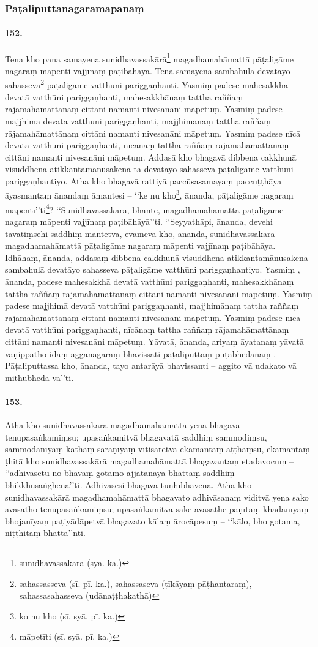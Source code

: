 \subsubsection{Pāṭaliputtanagaramāpanaṃ}

\paragraph{152.} Tena kho pana samayena sunidhavassakārā\footnote{sunīdhavassakārā (syā. ka.)} magadhamahāmattā pāṭaligāme nagaraṃ māpenti vajjīnaṃ paṭibāhāya. Tena samayena sambahulā devatāyo sahasseva\footnote{sahassasseva (sī. pī. ka.), sahassaseva (ṭīkāyaṃ pāṭhantaraṃ), sahassasahasseva (udānaṭṭhakathā)} pāṭaligāme vatthūni pariggaṇhanti. Yasmiṃ padese mahesakkhā devatā vatthūni pariggaṇhanti, mahesakkhānaṃ tattha raññaṃ rājamahāmattānaṃ cittāni namanti nivesanāni māpetuṃ. Yasmiṃ padese majjhimā devatā vatthūni pariggaṇhanti, majjhimānaṃ tattha raññaṃ rājamahāmattānaṃ cittāni namanti nivesanāni māpetuṃ. Yasmiṃ padese nīcā devatā vatthūni pariggaṇhanti, nīcānaṃ tattha raññaṃ rājamahāmattānaṃ cittāni namanti nivesanāni māpetuṃ. Addasā kho bhagavā dibbena cakkhunā visuddhena atikkantamānusakena tā devatāyo sahasseva pāṭaligāme vatthūni pariggaṇhantiyo. Atha kho bhagavā rattiyā paccūsasamayaṃ paccuṭṭhāya āyasmantaṃ ānandaṃ āmantesi – ‘‘ke nu kho\footnote{ko nu kho (sī. syā. pī. ka.)}, ānanda, pāṭaligāme nagaraṃ māpentī’’ti\footnote{māpetīti (sī. syā. pī. ka.)}? ‘‘Sunidhavassakārā, bhante, magadhamahāmattā pāṭaligāme nagaraṃ māpenti vajjīnaṃ paṭibāhāyā’’ti. ‘‘Seyyathāpi, ānanda, devehi tāvatiṃsehi saddhiṃ mantetvā, evameva kho, ānanda, sunidhavassakārā magadhamahāmattā pāṭaligāme nagaraṃ māpenti vajjīnaṃ paṭibāhāya. Idhāhaṃ, ānanda, addasaṃ dibbena cakkhunā visuddhena atikkantamānusakena sambahulā devatāyo sahasseva pāṭaligāme vatthūni pariggaṇhantiyo. Yasmiṃ , ānanda, padese mahesakkhā devatā vatthūni pariggaṇhanti, mahesakkhānaṃ tattha raññaṃ rājamahāmattānaṃ cittāni namanti nivesanāni māpetuṃ. Yasmiṃ padese majjhimā devatā vatthūni pariggaṇhanti, majjhimānaṃ tattha raññaṃ rājamahāmattānaṃ cittāni namanti nivesanāni māpetuṃ. Yasmiṃ padese nīcā devatā vatthūni pariggaṇhanti, nīcānaṃ tattha raññaṃ rājamahāmattānaṃ cittāni namanti nivesanāni māpetuṃ. Yāvatā, ānanda, ariyaṃ āyatanaṃ yāvatā vaṇippatho idaṃ agganagaraṃ bhavissati pāṭaliputtaṃ puṭabhedanaṃ . Pāṭaliputtassa kho, ānanda, tayo antarāyā bhavissanti – aggito vā udakato vā mithubhedā vā’’ti.

\paragraph{153.} Atha kho sunidhavassakārā magadhamahāmattā yena bhagavā tenupasaṅkamiṃsu; upasaṅkamitvā bhagavatā saddhiṃ sammodiṃsu, sammodanīyaṃ kathaṃ sāraṇīyaṃ vītisāretvā ekamantaṃ aṭṭhaṃsu, ekamantaṃ ṭhitā kho sunidhavassakārā magadhamahāmattā bhagavantaṃ etadavocuṃ – ‘‘adhivāsetu no bhavaṃ gotamo ajjatanāya bhattaṃ saddhiṃ bhikkhusaṅghenā’’ti. Adhivāsesi bhagavā tuṇhībhāvena. Atha kho sunidhavassakārā magadhamahāmattā bhagavato adhivāsanaṃ viditvā yena sako āvasatho tenupasaṅkamiṃsu; upasaṅkamitvā sake āvasathe paṇītaṃ khādanīyaṃ bhojanīyaṃ paṭiyādāpetvā bhagavato kālaṃ ārocāpesuṃ – ‘‘kālo, bho gotama, niṭṭhitaṃ bhatta’’nti.

